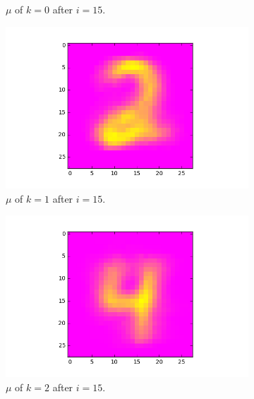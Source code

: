 \documentclass[a4paper,10pt]{article}
\numberwithin{equation}{section} %
\numberwithin{figure}{section} %
\numberwithin{table}{section} %
\theoremstyle{mytheor}
\begin{document}
\begin{enumerate}
\begin{figure}[h!]
\begin{subfigure}[b]{0.26\textwidth}
				\caption{$\mu$ of $k=0$ after $i=15$.}
			\end{subfigure}
			\begin{subfigure}[b]{0.26\textwidth}
				\includegraphics[width=\textwidth]{digits/14_k3_class1.png}\vspace{-0.4cm}
				\caption{$\mu$ of $k=1$ after $i=15$.}
			\end{subfigure}
			\begin{subfigure}[b]{0.26\textwidth}
				\includegraphics[width=\textwidth]{digits/14_k3_class2.png}\vspace{-0.4cm}
				\caption{$\mu$ of $k=2$ after $i=15$.}
			\end{subfigure}
			\begin{subfigure}[b]{0.26\textwidth}

\end{subfigure}
\end{figure}
\end{enumerate}
\end{document}
